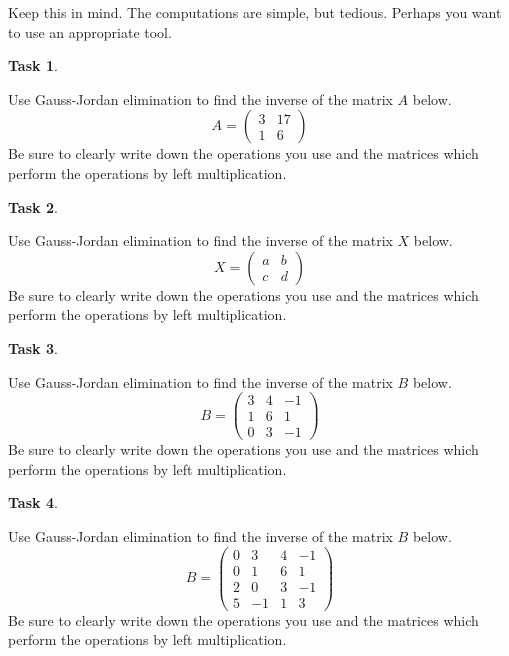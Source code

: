 \documentclass[10pt,]{book}
\theoremstyle{plain}
\theoremstyle{definition}
\numberwithin{equation}{section}
\newtheorem{task}{Task}[chapter]
\begin{document}
      Keep this in mind. The computations are simple, but tedious.
      Perhaps you want to use an appropriate tool.
\begin{task}
\label{task-62}

        Use Gauss-Jordan elimination to find the inverse of the matrix \(A\) below.
        \[
        A = \begin{pmatrix} 3 & 17 \\ 1 & 6 \end{pmatrix}
        \]
        Be sure to clearly write down the operations you use and the matrices
        which perform the operations by left multiplication.
      \end{task}
\begin{task}
\label{task-63}

        Use Gauss-Jordan elimination to find the inverse of the matrix \(X\) below.
        \[
        X = \begin{pmatrix} a & b \\ c & d \end{pmatrix}
        \]
        Be sure to clearly write down the operations you use and the matrices
        which perform the operations by left multiplication.
      \end{task}
\begin{task}
\label{task-64}

        Use Gauss-Jordan elimination to find the inverse of the matrix \(B\) below.
        \[
        B = \begin{pmatrix} 3 & 4 & -1\\ 1 & 6 & 1 \\
        0 & 3 & -1 \end{pmatrix}
        \]
        Be sure to clearly write down the operations you use and the matrices
        which perform the operations by left multiplication.
      \end{task}
\begin{task}
\label{task-65}

        Use Gauss-Jordan elimination to find the inverse of the matrix \(B\) below.
        \[
        B = \begin{pmatrix}
        0 & 3 & 4 & -1\\
        0 & 1 & 6 & 1 \\
        2 & 0 & 3 & -1 \\
        5 & -1 & 1 & 3
        \end{pmatrix}
        \]
        Be sure to clearly write down the operations you use and the matrices
        which perform the operations by left multiplication.
      \end{task}
\end{document}
